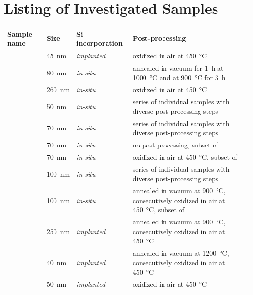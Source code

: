 	 \section[Samples List]{Listing of Investigated Samples}

		\begin{table}[h!]
			 \centering

				\begin{tabularx}{\linewidth}{@{} *3l X @{}}
				 \toprule
				 Sample name & Size & Si incorporation & Post-processing \\
				 \midrule
				 \hphtimpfortyfive & \SI{45}{nm} & \textit{implanted} & oxidized in air at \SI{450}{\celsius}\\ \hline
				 \hphtimpeighty & \SI{80}{nm} & \textit{in-situ} &annealed in vacuum for \SI{1}{\hour} at \SI{1000}{\celsius} and at \SI{900}{\celsius} for \SI{3}{\hour}\\ \hline
				 \hphtimptwosixty & \SI{260}{nm} & \textit{in-situ} & oxidized in air at \SI{450}{\celsius}\\ \hline
				 \insituF & \SI{50}{nm} & \textit{in-situ} &series of individual samples with diverse post-processing steps\\ \hline
				 \insituS & \SI{70}{nm} & \textit{in-situ} &series of individual samples with diverse post-processing steps\\ \hline
				 \insituSn & \SI{70}{nm} & \textit{in-situ} & no post-processing, subset of \insituS \\ \hline
				 \insituSo & \SI{70}{nm} & \textit{in-situ} &oxidized in air at \SI{450}{\celsius}, subset of \insituS \\ \hline
				 \insituH & \SI{100}{nm} & \textit{in-situ} &series of individual samples with diverse post-processing steps\\ \hline
				 \insituHao & \SI{100}{nm} & \textit{in-situ} &annealed in vacuum at \SI{900}{\celsius}, consecutively oxidized in air at \SI{450}{\celsius}, subset of \insituH \\ \hline
				 \implantedTao & \SI{250}{nm} &  \textit{implanted}  &annealed in vacuum at \SI{900}{\celsius}, consecutively oxidized in air at \SI{450}{\celsius}\\ \hline
				 \milltwofortyann & \SI{40}{nm} &  \textit{implanted}  &annealed in vacuum at \SI{1200}{\celsius}, consecutively oxidized in air at \SI{450}{\celsius}\\ \hline
				 \milltwofiftyno & \SI{50}{nm} &  \textit{implanted}  & oxidized in air at \SI{450}{\celsius}\\ \hline

\end{tabularx}
\end{table}
